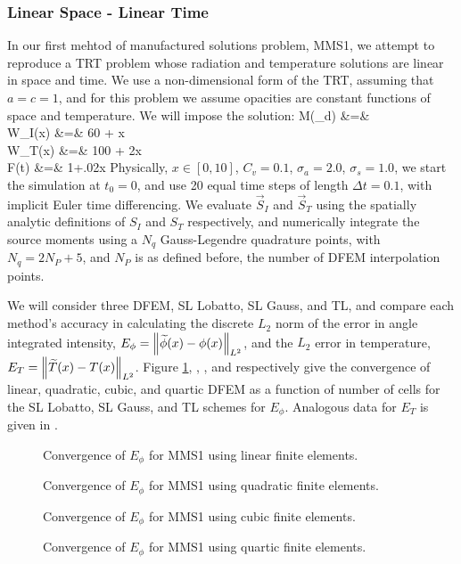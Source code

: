 \subsubsection{Linear Space - Linear Time  }
In our first mehtod of manufactured solutions problem, MMS1, we attempt to reproduce a TRT problem whose radiation and temperature solutions are linear in space and time.
We use a non-dimensional form of the TRT, assuming that $a=c=1$, and for this problem we assume opacities are constant functions of space and temperature.
We will impose the solution:
\beanum
M(\mu_d) &=&  \\
W_I(x) &=& 60 + x\\
W_T(x) &=&  100 + 2x \\
F(t) &=& 1+.02x \pep
\eeanum
Physically, $x\in[0,10]$, $C_v = 0.1$, $\sigma_a = 2.0$, $\sigma_s = 1.0$, we start the simulation at $t_0 = 0$, and use 20 equal time steps of length $\Delta t = 0.1$, with implicit Euler time differencing. 
We evaluate $\vec{S}_I$ and $\vec{S}_T$ using the spatially analytic definitions of $S_I$ and $S_T$ respectively, and numerically integrate the source moments using a $N_q$ Gauss-Legendre quadrature points, with $N_q = 2N_P + 5$, and $N_P$ is as defined before, the number of DFEM interpolation points.

We will consider three DFEM, SL Lobatto, SL Gauss, and TL, and compare each method’s accuracy in calculating the discrete $L_2$ norm of the error in angle integrated intensity, $E_{\phi} = \left\lVert  \widetilde{\phi}(x) - \phi(x) \right\rVert_{L^2}$, and the $L_2$ error in temperature, $E_T = \left\lVert  \widetilde{T}(x) - T(x)  \right\rVert_{L^2}$.
Figure \ref{fig:mms1_linear_phi}, , , and  respectively give the convergence of linear, quadratic, cubic, and quartic DFEM as a function of number of cells for the SL Lobatto, SL Gauss, and TL schemes for $E_{\phi}$.
Analogous data for $E_{T}$ is given in .
\begin{figure}[!ht]
\centering

\caption{Convergence of $E_{\phi}$ for MMS1 using linear finite elements.}
\label{fig:mms1_linear_phi}
\end{figure}
\begin{figure}[!ht]
\centering

\caption{Convergence of $E_{\phi}$ for MMS1 using quadratic finite elements.}
\label{fig:mms1_quadratic_phi}
\end{figure}
\begin{figure}[!ht]
\centering

\caption{Convergence of $E_{\phi}$ for MMS1 using cubic finite elements.}
\label{fig:mms1_cubic_phi}
\end{figure}
\begin{figure}[!ht]
\centering

\caption{Convergence of $E_{\phi}$ for MMS1 using quartic finite elements.}
\label{fig:mms1_quartic_phi}
\end{figure}

